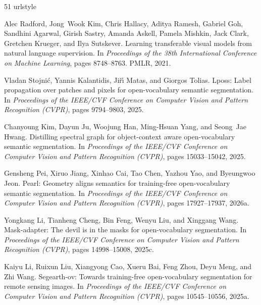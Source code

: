 \begin{thebibliography}{51}
\providecommand{\natexlab}[1]{#1}
\providecommand{\url}[1]{\texttt{#1}}
\expandafter\ifx\csname urlstyle\endcsname\relax
  \providecommand{\doi}[1]{doi: #1}\else
  \providecommand{\doi}{doi: \begingroup \urlstyle{rm}\Url}\fi

Alec Radford, Jong~Wook Kim, Chris Hallacy, Aditya Ramesh, Gabriel Goh,
  Sandhini Agarwal, Girish Sastry, Amanda Askell, Pamela Mishkin, Jack Clark,
  Gretchen Krueger, and Ilya Sutskever.
\newblock Learning transferable visual models from natural language
  supervision.
\newblock In \emph{Proceedings of the 38th International Conference on Machine
  Learning}, pages 8748--8763. PMLR, 2021.

Vladan Stojni\'c, Yannis Kalantidis, Ji\v{r}{\'\i} Matas, and Giorgos Tolias.
\newblock Lposs: Label propagation over patches and pixels for open-vocabulary
  semantic segmentation.
\newblock In \emph{Proceedings of the IEEE/CVF Conference on Computer Vision
  and Pattern Recognition (CVPR)}, pages 9794--9803, 2025.

Chanyoung Kim, Dayun Ju, Woojung Han, Ming-Hsuan Yang, and Seong~Jae Hwang.
\newblock Distilling spectral graph for object-context aware open-vocabulary
  semantic segmentation.
\newblock In \emph{Proceedings of the IEEE/CVF Conference on Computer Vision
  and Pattern Recognition (CVPR)}, pages 15033--15042, 2025.

Gensheng Pei, Xiruo Jiang, Xinhao Cai, Tao Chen, Yazhou Yao, and Byeungwoo
  Jeon.
\newblock Pearl: Geometry aligns semantics for training-free open-vocabulary
  semantic segmentation.
\newblock In \emph{Proceedings of the IEEE/CVF Conference on Computer Vision
  and Pattern Recognition (CVPR)}, pages 17927--17937, 2026{\natexlab{a}}.

Yongkang Li, Tianheng Cheng, Bin Feng, Wenyu Liu, and Xinggang Wang.
\newblock Mask-adapter: The devil is in the masks for open-vocabulary
  segmentation.
\newblock In \emph{Proceedings of the IEEE/CVF Conference on Computer Vision
  and Pattern Recognition (CVPR)}, pages 14998--15008, 2025{\natexlab{c}}.

Kaiyu Li, Ruixun Liu, Xiangyong Cao, Xueru Bai, Feng Zhou, Deyu Meng, and Zhi
  Wang.
\newblock Segearth-ov: Towards training-free open-vocabulary segmentation for
  remote sensing images.
\newblock In \emph{Proceedings of the IEEE/CVF Conference on Computer Vision
  and Pattern Recognition (CVPR)}, pages 10545--10556, 2025{\natexlab{a}}.


\end{thebibliography}
